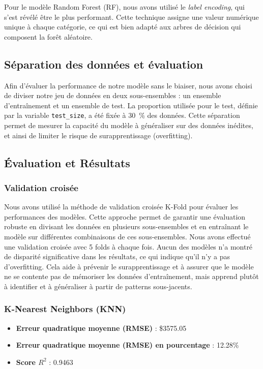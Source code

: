 \documentclass[12pt]{report}
\begin{document}
Pour le modèle Random Forest (RF), nous avons utilisé le \textit{label encoding}, qui s'est révélé être le plus performant. Cette technique assigne une valeur numérique unique à chaque catégorie, ce qui est bien adapté aux arbres de décision qui composent la forêt aléatoire.

\subsection{Séparation des données et évaluation} 

Afin d’évaluer la performance de notre modèle sans le biaiser, nous avons choisi de diviser notre jeu de données en deux sous-ensembles : un ensemble d’entraînement et un ensemble de test. La proportion utilisée pour le test, définie par la variable \texttt{test\_size}, a été fixée à 30~\% des données. Cette séparation permet de mesurer la capacité du modèle à généraliser sur des données inédites, et ainsi de limiter le risque de surapprentissage (overfitting).


\subsection{Évaluation et Résultats}

\subsubsection{Validation croisée}

Nous avons utilisé la méthode de validation croisée K-Fold pour évaluer les performances des modèles. Cette approche permet de garantir une évaluation robuste en divisant les données en plusieurs sous-ensembles et en entraînant le modèle sur différentes combinaisons de ces sous-ensembles. Nous avons effectué une validation croisée avec 5 folds à chaque fois. Aucun des modèles n'a montré de disparité significative dans les résultats, ce qui indique qu'il n'y a pas d'overfitting. Cela aide à prévenir le surapprentissage et à assurer que le modèle ne
se contente pas de mémoriser les données d'entraînement, mais apprend plutôt à identifier
et à généraliser à partir de patterns sous-jacents.


\subsubsection{K-Nearest Neighbors (KNN)}

\begin{itemize}
    \item \textbf{Erreur quadratique moyenne (RMSE)} : \$3575.05
    \item \textbf{Erreur quadratique moyenne (RMSE) en pourcentage} : 12.28\%
    \item \textbf{Score \( R^2 \)} : 0.9463
\end{itemize}
\end{document}
